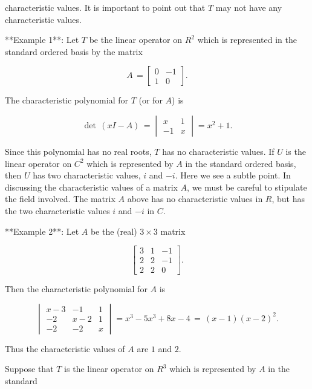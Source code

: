 characteristic values. It is important to point out that \(T\) may not have any characteristic values.

**Example 1**: Let \(T\) be the linear operator on \(R^{2}\) which is represented in the standard ordered basis by the matrix

\[A\,=\begin{bmatrix}0&-1\\ 1&0\end{bmatrix}.\]

The characteristic polynomial for \(T\) (or for \(A\)) is

\[\det\,(xI-A)\,=\begin{vmatrix}x&1\\ -1&x\end{vmatrix}=x^{2}+1.\]

Since this polynomial has no real roots, \(T\) has no characteristic values. If \(U\) is the linear operator on \(C^{2}\) which is represented by \(A\) in the standard ordered basis, then \(U\) has two characteristic values, \(i\) and \(-i\). Here we see a subtle point. In discussing the characteristic values of a matrix \(A\), we must be careful to stipulate the field involved. The matrix \(A\) above has no characteristic values in \(R\), but has the two characteristic values \(i\) and \(-i\) in \(C\).

**Example 2**: Let \(A\) be the (real) \(3\times 3\) matrix

\[\begin{bmatrix}3&1&-1\\ 2&2&-1\\ 2&2&0\end{bmatrix}.\]

Then the characteristic polynomial for \(A\) is

\[\begin{vmatrix}x-3&-1&1\\ -2&x-2&1\\ -2&-2&x\end{vmatrix}=x^{3}-5x^{3}+8x-4\,=\,(x-1)(x-2)^{2}.\]

Thus the characteristic values of \(A\) are \(1\) and \(2\).

Suppose that \(T\) is the linear operator on \(R^{3}\) which is represented by \(A\) in the standard 